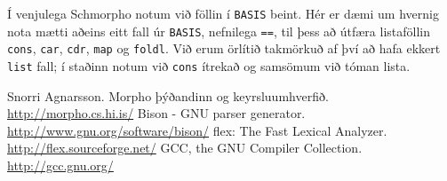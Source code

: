 \documentclass[a4paper,icelandic]{article}
\begin{document}
Í venjulega Schmorpho notum við föllin í \verb|BASIS| beint.  Hér
er dæmi um hvernig nota mætti aðeins eitt fall úr \verb|BASIS|, nefnilega
\verb|==|, til þess að útfæra listaföllin \verb|cons|, \verb|car|,
\verb|cdr|, \verb|map| og \verb|foldl|. Við erum örlítið takmörkuð af
því að hafa ekkert \verb|list| fall; í staðinn notum við \verb|cons|
ítrekað og samsömum  við tóman lista.





\begin{thebibliography}{4}
Snorri Agnarsson. Morpho þýðandinn og keyrsluumhverfið.\\
  \href{http://morpho.cs.hi.is/}{http://morpho.cs.hi.is/}
Bison - GNU parser generator. \\
  \href{http://www.gnu.org/software/bison/}{http://www.gnu.org/software/bison/}
flex: The Fast Lexical Analyzer. \\
  \href{http://flex.sourceforge.net/}{http://flex.sourceforge.net/}
GCC, the GNU Compiler Collection.\\
  \href{http://gcc.gnu.org/}{http://gcc.gnu.org/}
\end{thebibliography}
\end{document}
